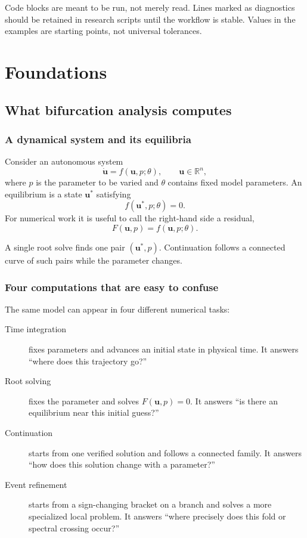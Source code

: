 \documentclass[11pt,oneside]{book}
\newcommand{\state}{\bm{u}}
\newcommand{\param}{p}
\newcommand{\R}{\mathbb{R}}
\newcommand{\residual}{F}
\begin{document}
Code blocks are meant to be run, not merely read. Lines marked as diagnostics
should be retained in research scripts until the workflow is stable. Values in
the examples are starting points, not universal tolerances.

\tableofcontents

\mainmatter

\part{Foundations}

\chapter{What bifurcation analysis computes}

\section{A dynamical system and its equilibria}

Consider an autonomous system
\[
  \dot{\state}=f(\state,\param;\theta),
  \qquad \state\in\R^n,
\]
where $\param$ is the parameter to be varied and $\theta$ contains fixed model
parameters. An equilibrium is a state $\state^*$ satisfying
\[
  f(\state^*,\param;\theta)=0.
\]
For numerical work it is useful to call the right-hand side a residual,
\[
  \residual(\state,\param)=f(\state,\param;\theta).
\]

A single root solve finds one pair $(\state^*,\param)$. Continuation follows a
connected curve of such pairs while the parameter changes.

\section{Four computations that are easy to confuse}

The same model can appear in four different numerical tasks:

\begin{description}
  \item[Time integration] fixes parameters and advances an initial state in
        physical time. It answers ``where does this trajectory go?''
  \item[Root solving] fixes the parameter and solves $F(\state,p)=0$. It
        answers ``is there an equilibrium near this initial guess?''
  \item[Continuation] starts from one verified solution and follows a connected
        family. It answers ``how does this solution change with a parameter?''
  \item[Event refinement] starts from a sign-changing bracket on a branch and
        solves a more specialized local problem. It answers ``where precisely
        does this fold or spectral crossing occur?''
\end{description}
\end{document}
